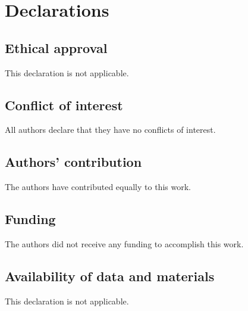 \documentclass[12pt,twoside,reqno]{amsart}
\numberwithin{equation}{section}
\begin{document}
\section*{Declarations}

\subsection*{Ethical approval}
This declaration is not applicable.
\subsection*{Conflict of interest}
All authors declare that they have no conflicts of interest.
\subsection*{Authors' contribution}
The authors have contributed equally to this work.
\subsection*{Funding}
The authors did not receive any funding to accomplish this work.
\subsection*{Availability of data and materials}
This declaration is not applicable.
\end{document}
